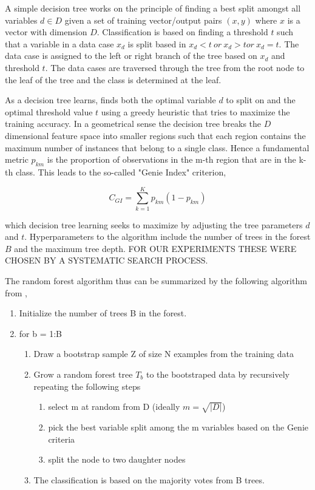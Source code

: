 \documentclass[proposal]{umassthesis}
\begin{document}
{A simple decision tree works on the principle of finding a best split amongst all variables $d \in D$ given a set of training vector/output pairs $(x,y)$ where $x$ is a vector with dimension $D$. Classification is based on finding a threshold $t$ such that a variable in a data case $x_d$ is split based in $x_d < t \ or \ x_d > t or \ x_d =t$. The data case is assigned to the left or right branch of the tree based on $x_d$ and threshold $t$. The data cases are traversed through the tree from the root node to the leaf of the tree and the class is determined at the leaf.

As a decision tree learns, finds both the optimal variable $d$ to split on and the optimal threshold value $t$ using a greedy heuristic that tries to maximize the training accuracy. In a geometrical sense the decision tree breaks the $D$ dimensional feature space into smaller regions such that each region contains the maximum number of instances that belong to a single class. Hence a fundamental metric $p_{km}$ is the proportion of observations in the m-th region that are in the k-th class. This leads to the so-called "Genie Index" criterion,

\begin{equation}
C_{GI} =  \sum_{k=1}^{K} p_{km} (1 - p_{km})
\end{equation}

which decision tree learning seeks to maximize by adjusting the tree parameters $d$ and $t$. Hyperparameters to the algorithm include the number of trees in the forest $B$ and the maximum tree depth. FOR OUR EXPERIMENTS THESE WERE CHOSEN BY A SYSTEMATIC SEARCH PROCESS.
 
The random forest algorithm thus can be summarized by the following algorithm from \cite{friedman2001elements},
 
\begin{enumerate}
\item Initialize the number of trees B in the forest. 
\item for b = 1:B
\begin{enumerate}
\item Draw a bootstrap sample Z of size N examples from the training data
\item Grow a random forest tree $T_b$ to the bootstraped data by recursively repeating the following steps
\begin{enumerate}
\item select m at random from D (ideally $m = \sqrt{|D|}$)
\item pick the best variable split among the m variables based on the Genie criteria
\item split the node to two daughter nodes
\end{enumerate}
\item The classification is based on the majority votes from B trees. 
\end{enumerate}
\end{enumerate}

}
\end{document}
